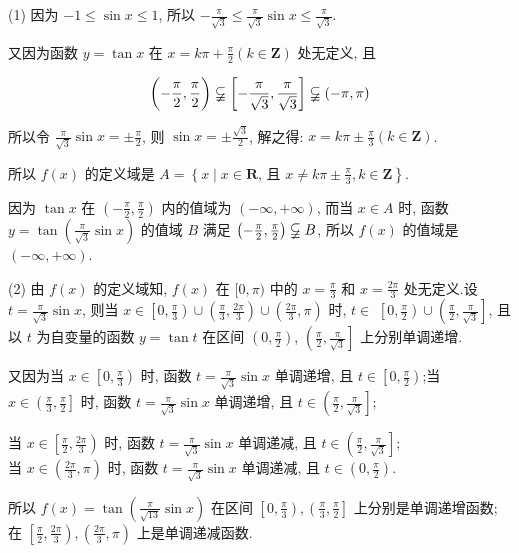 \begin{solution}
	(1) 因为 $-1 \leqslant \sin x \leqslant 1$, 所以 $-\frac{\pi}{\sqrt{3}} \leqslant \frac{\pi}{\sqrt{3}} \sin x \leqslant \frac{\pi}{\sqrt{3}}$.

	又因为函数 $y=\tan x$ 在 $x=k \pi+\frac{\pi}{2}(k \in \mathbf{Z})$ 处无定义, 且

	$$
		\left(-\frac{\pi}{2}, \frac{\pi}{2}\right) \varsubsetneqq\left[-\frac{\pi}{\sqrt{3}}, \frac{\pi}{\sqrt{3}}\right] \varsubsetneqq(-\pi, \pi)
	$$

	所以令 $\frac{\pi}{\sqrt{3}} \sin x= \pm \frac{\pi}{2}$, 则 $\sin x= \pm \frac{\sqrt{3}}{2}$, 解之得: $x=k \pi \pm \frac{\pi}{3}(k \in \mathbf{Z})$.

	所以 $f(x)$ 的定义域是 $A=\left\{x \mid x \in \mathbf{R}\right.$, 且 $\left.x \neq k \pi \pm \frac{\pi}{3}, k \in \mathbf{Z}\right\}$.

	因为 $\tan x$ 在 $\left(-\frac{\pi}{2}, \frac{\pi}{2}\right)$ 内的值域为 $(-\infty,+\infty)$, 而当 $x \in A$ 时, 函数 $y=\tan \left(\frac{\pi}{\sqrt{3}} \sin x\right)$ 的值域 $B$ 满足 $\left(-\frac{\pi}{2}, \frac{\pi}{2}\right) \varsubsetneqq B$, 所以 $f(x)$ 的值域是 $(-\infty,+\infty)$.

	(2) 由 $f(x)$ 的定义域知, $f(x)$ 在 $[0, \pi)$ 中的 $x=\frac{\pi}{3}$ 和 $x=\frac{2 \pi}{3}$ 处无定义.设 $t=\frac{\pi}{\sqrt{3}} \sin x$, 则当 $x \in\left[0, \frac{\pi}{3}\right) \cup\left(\frac{\pi}{3}, \frac{2 \pi}{3}\right) \cup\left(\frac{2 \pi}{3}, \pi\right)$ 时, $t \in$ $\left[0, \frac{\pi}{2}\right) \cup\left(\frac{\pi}{2}, \frac{\pi}{\sqrt{3}}\right]$, 且以 $t$ 为自变量的函数 $y=\tan t$ 在区间 $\left(0, \frac{\pi}{2}\right)$, $\left(\frac{\pi}{2}, \frac{\pi}{\sqrt{3}}\right]$ 上分别单调递增.

				又因为当 $x \in\left[0, \frac{\pi}{3}\right)$ 时, 函数 $t=\frac{\pi}{\sqrt{3}} \sin x$ 单调递增, 且 $t \in\left[0, \frac{\pi}{2}\right)$;当 $x \in\left(\frac{\pi}{3}, \frac{\pi}{2}\right]$ 时, 函数 $t=\frac{\pi}{\sqrt{3}} \sin x$ 单调递增, 且 $t \in\left(\frac{\pi}{2}, \frac{\pi}{\sqrt{3}}\right]$;

			当 $x \in\left[\frac{\pi}{2}, \frac{2 \pi}{3}\right)$ 时, 函数 $t=\frac{\pi}{\sqrt{3}} \sin x$ 单调递减, 且 $t \in\left(\frac{\pi}{2}, \frac{\pi}{\sqrt{3}}\right]$;\\
	当 $x \in\left(\frac{2 \pi}{3}, \pi\right)$ 时, 函数 $t=\frac{\pi}{\sqrt{3}} \sin x$ 单调递减, 且 $t \in\left(0, \frac{\pi}{2}\right)$.

	所以 $f(x)=\tan \left(\frac{\pi}{\sqrt{13}} \sin x\right)$ 在区间 $\left[0, \frac{\pi}{3}\right),\left(\frac{\pi}{3}, \frac{\pi}{2}\right]$ 上分别是单调递增函数; 在 $\left[\frac{\pi}{2}, \frac{2 \pi}{3}\right),\left(\frac{2 \pi}{3}, \pi\right)$ 上是单调递减函数.


\end{solution}

